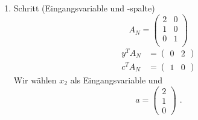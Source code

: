 \documentclass[a4paper]{scrartcl}
\begin{document}
\begin{enumerate}[label=\bfseries\arabic*.]
\begin{enumerate}
\begin{enumerate}[1.]
\begin{enumerate}[1.]
                            \item Schritt (Eingangsvariable und -spalte)
                                \begin{equation}
                                    A_N =
                                    \begin{pmatrix}
                                        2 & 0 \\
                                        1 & 0 \\
                                        0 & 1 \\
                                    \end{pmatrix}
                                \end{equation}
                                \begin{align}
                                    y^TA_N &=
                                    \begin{pmatrix}
                                        0 & 2
                                    \end{pmatrix} \\
                                    c^TA_N &=
                                    \begin{pmatrix}
                                        1 & 0
                                    \end{pmatrix}
                                \end{align}
                                Wir wählen $x_2$ als Eingangsvariable und
                                \begin{equation}
                                    a =
                                    \begin{pmatrix}
                                        2 \\ 1 \\ 0
                                    \end{pmatrix}
                                    \text{ .}   
                                \end{equation}


\end{enumerate}
\end{enumerate}
\end{enumerate}
\end{enumerate}
\end{document}
